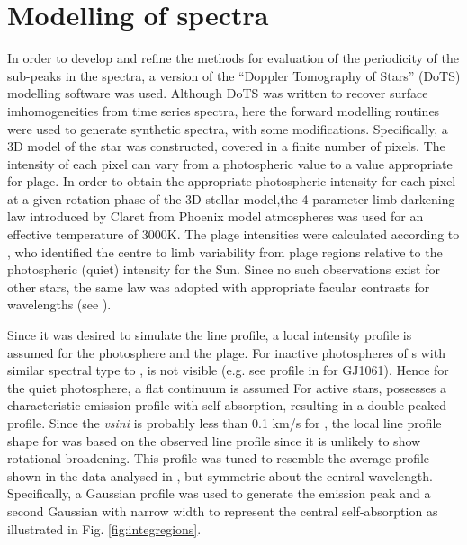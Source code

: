 \chapter{Modelling of {\prox} spectra}
\protect\label{chapter:modelling}

In order to develop and refine the methods for evaluation of the periodicity of the sub-peaks in the {\prox} spectra, a
version of the ``Doppler Tomography of Stars'' (DoTS) modelling software \citep{CCamerondotsa} was used. Although DoTS
was written to recover surface imhomogeneities from time series spectra, here the forward modelling routines were used
to generate synthetic spectra, with some modifications. Specifically, a 3D model of the star was constructed, covered in
a finite number of pixels. The intensity of each pixel can vary from a photospheric value to a value appropriate for
plage. In order to obtain the appropriate photospheric intensity for each pixel at a given rotation phase of the 3D
stellar model,the 4-parameter limb darkening law introduced by Claret from Phoenix model atmospheres \citep{claret00a}
was used for an effective temperature of 3000K. The plage intensities were calculated according to \citet[Section
4.1]{unruh99}, who identified the centre to limb variability from plage regions relative to the photospheric (quiet)
intensity for the Sun. Since no such observations exist for other stars, the same law was adopted with appropriate
facular contrasts for {\ha} wavelengths (see \citet[figs 3 \& 4]{unruh99}).

Since it was desired to simulate the {\ha} line profile, a local intensity profile is assumed for the photosphere and
the plage. For inactive photospheres of \rdwarf s with similar spectral type to {\prox}, {\ha} is not visible (e.g. see
{\ha} profile in \citet[fig. 6]{barnes14} for GJ1061). Hence for the quiet photosphere, a flat continuum is assumed For
active stars, {\ha} possesses a characteristic emission profile with self-absorption, resulting in a double-peaked
profile. Since the \textit{vsini} is probably less than 0.1 km/s for \prox, the local line profile shape for {\ha} was
based on the observed {\prox} line profile since it is unlikely to show rotational broadening. This profile was tuned to
resemble the average {\ha} profile shown in the {\uves} data analysed in \citet{fuhrmeister11}, but symmetric about the
central wavelength. Specifically, a Gaussian profile was used to generate the emission peak and a second Gaussian with
narrow width to represent the central self-absorption as illustrated in Fig. \ref{fig:integregions}.

